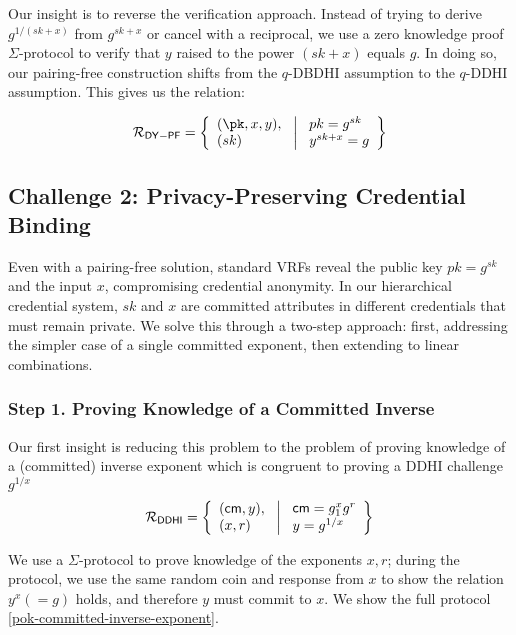 Our insight is to reverse the verification approach. Instead of trying to derive $g^{1/(sk+x)}$ from $g^{sk+x}$ or cancel with a reciprocal, we use a zero knowledge proof $\Sigma$-protocol to verify that $y$ raised to the power $(sk+x)$ equals $g$. In doing so, our pairing-free construction shifts from the $q$-DBDHI assumption to the $q$-DDHI assumption. This gives us the relation:

\[
\mathcal{R}_{\mathsf{DY-PF}} = \left\{ 
\begin{array}{l} 
(\pk, x, y),\\
(sk) 
\end{array}
\ \middle|
\ \begin{array}{l}
pk = g^{sk} \\
y^{sk + x} = g  \\
\end{array} \right\}
\]

\subsection{Challenge 2: Privacy-Preserving Credential Binding}

Even with a pairing-free solution, standard VRFs reveal the public key $pk = g^{sk}$ and the input $x$,  compromising credential anonymity. In our hierarchical credential system, $sk$ and $x$ are committed attributes in different credentials that must remain private. We solve this through a two-step approach: first, addressing the simpler case of a single committed exponent, then extending to linear combinations.

\subsubsection*{Step 1. Proving Knowledge of a Committed Inverse}
Our first insight is reducing this problem to the problem of proving knowledge of a (committed) inverse exponent which is congruent to proving a DDHI challenge $g^{1/x}$
\[
\mathcal{R}_{\mathsf{DDHI}} = \left\{ 
\begin{array}{l} (\mathsf{cm}, y),\\
(x, r) 
\end{array}
\ \middle|
\ \begin{array}{l}
\mathsf{cm} = g_1^{x} g^r \\
y = g^{1/x} \\
\end{array} \right\}
\]

We use a $\Sigma$-protocol to prove knowledge of the exponents $x, r$; during the protocol, we use the same random coin and response from $x$ to show the relation $y^x (=g)$ holds, and therefore $y$ must commit to $x$. We show the full protocol \ref{pok-committed-inverse-exponent}. 

